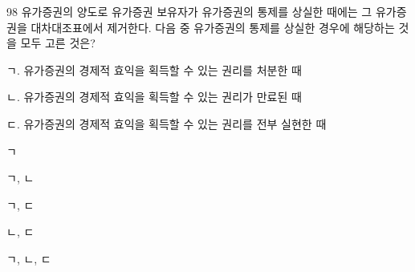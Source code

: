\begin{question}{98}
유가증권의 양도로 유가증권 보유자가 유가증권의 통제를 상실한 때에는 그 유가증권을 대차대조표에서 제거한다. 다음 중 유가증권의 통제를 상실한 경우에 해당하는 것을 모두 고른 것은?
\begin{framedtext}
ㄱ. 유가증권의 경제적 효익을 획득할 수 있는 권리를 처분한 때 \par
ㄴ. 유가증권의 경제적 효익을 획득할 수 있는 권리가 만료된 때 \par
ㄷ. 유가증권의 경제적 효익을 획득할 수 있는 권리를 전부 실현한 때
\end{framedtext}
\begin{choices}
  \item ㄱ
  \item ㄱ, ㄴ
  \item ㄱ, ㄷ
  \item ㄴ, ㄷ
  \item ㄱ, ㄴ, ㄷ
\end{choices}
\end{question}
